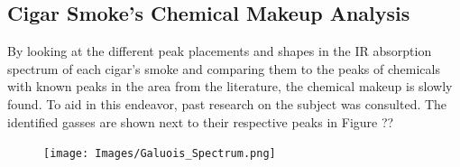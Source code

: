 \documentclass[reprint,amsmath,amssymb,aps, prl]{revtex4-2}
\begin{document}
\subsection{Cigar Smoke's Chemical Makeup Analysis}
By looking at the different peak placements and shapes in the IR absorption spectrum of each cigar's smoke and comparing them to the peaks of chemicals with known peaks in the area from the literature, 
the chemical makeup is slowly found. To aid in this endeavor, past research
on the subject was consulted. The identified gasses are shown next to their respective peaks in Figure ??
\begin{figure}
    \texttt{[image: Images/Galuois\_Spectrum.png]} %
    
\end{figure}


\end{document}
